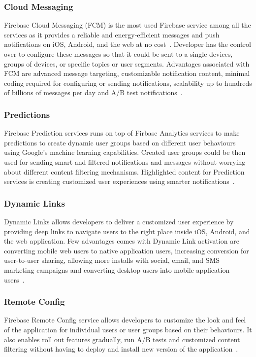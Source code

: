 \subsubsection{Cloud Messaging} Firebase Cloud Messaging (FCM) is the most used
Firebase service among all the services as it provides a reliable and
energy-efficient messages and push notifications on iOS, Android, and the web at
no cost~\cite{hid-sp18-409-www-firebase-products}. Developer has the control
over to configure these messages so that it could be sent to a single devices,
groups of devices, or specific topics or user segments. Advantages associated
with FCM are advanced message targeting, customizable notification content,
minimal coding required for configuring or sending notifications, scalability up
to hundreds of billions of messages per day and A/B test
notifications~\cite{hid-sp18-409-www-firebase-merged,
	hid-sp18-409-www-firebase-products}.

\subsubsection{Predictions} Firebase Prediction services runs on top of Firbase
Analytics services to make predictions to create dynamic user groups based on
different user behaviours using Google's machine learning capabilities. Created
user groups could be then used for sending smart and filtered notifications and
messages without worrying about different content filtering mechanisms.
Highlighted content for Prediction services is creating customized user
experiences using smarter
notifications~\cite{hid-sp18-409-www-firebase-products}.

\subsubsection{Dynamic Links} Dynamic Links allows developers to deliver a
customized user experience by providing deep links to navigate users to the
right place inside iOS, Android, and the web application. Few advantages comes
with Dynamic Link activation are converting mobile web users to native
application users, increasing conversion for user-to-user sharing, allowing more
installs with social, email, and SMS marketing campaigns and converting desktop
users into mobile application users~\cite{hid-sp18-409-www-firebase-wikipedia,
	hid-sp18-409-www-firebase-products}.

\subsubsection{Remote Config} Firebase Remote Config service allows developers
to customize the look and feel of the application for individual users or user
groups based on their behaviours. It also enables roll out features gradually,
run A/B tests and customized content filtering without having to deploy and
install new version of the
application~\cite{hid-sp18-409-www-firebase-products}.

